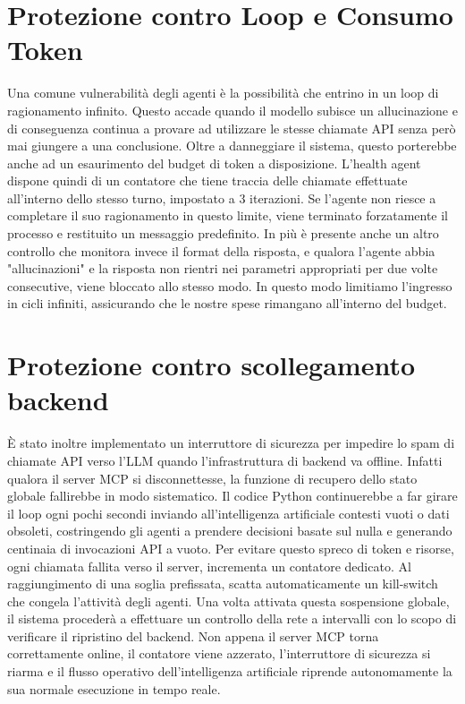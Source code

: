 \section{Protezione contro Loop e Consumo Token}
\label{sec:protezione_loop}
Una comune vulnerabilità degli agenti è la possibilità che entrino in un loop di ragionamento infinito. Questo accade quando il modello subisce un allucinazione e di conseguenza continua a provare ad utilizzare le stesse chiamate API senza però mai giungere a una conclusione. Oltre a danneggiare il sistema, questo porterebbe anche ad un esaurimento del budget di token a disposizione. L'health agent dispone quindi di un contatore che tiene traccia delle chiamate effettuate all'interno dello stesso turno, impostato a 3 iterazioni. Se l'agente non riesce a completare il suo ragionamento in questo limite, viene terminato forzatamente il processo e restituito un messaggio predefinito. In più è presente anche un altro controllo che monitora invece il format della risposta, e qualora l'agente abbia "allucinazioni" e la risposta non rientri nei parametri appropriati per due volte consecutive, viene bloccato allo stesso modo. In questo modo limitiamo l'ingresso in cicli infiniti, assicurando che le nostre spese rimangano all'interno del budget. 

\section{Protezione contro scollegamento backend}
È stato inoltre implementato un interruttore di sicurezza per impedire lo spam di chiamate API verso l'LLM quando l'infrastruttura di backend va offline.
Infatti qualora il server MCP si disconnettesse, la funzione di recupero dello stato globale fallirebbe in modo sistematico. Il codice Python continuerebbe a far girare il loop ogni pochi secondi inviando all'intelligenza artificiale contesti vuoti o dati obsoleti, costringendo gli agenti a prendere decisioni basate sul nulla e generando centinaia di invocazioni API a vuoto. Per evitare questo spreco di token e risorse, ogni chiamata fallita verso il server, incrementa un contatore dedicato. Al raggiungimento di una soglia prefissata, scatta automaticamente un kill-switch che congela l'attività degli agenti. Una volta attivata questa sospensione globale, il sistema procederà a effettuare un controllo della rete a intervalli con lo scopo di verificare il ripristino del backend. Non appena il server MCP torna correttamente online, il contatore viene azzerato, l'interruttore di sicurezza si riarma e il flusso operativo dell'intelligenza artificiale riprende autonomamente la sua normale esecuzione in tempo reale.
